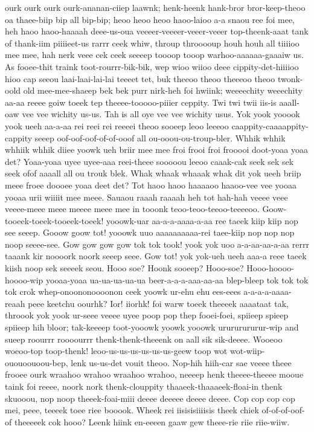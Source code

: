 \documentclass[12pt,a4paper]{article}
\begin{document}
\begin{drama}
ourk ourk ourk ourk-ananan-ciiep laawnk; henk-heenk hank-bror bror-keep-theoo oa thaee-biip bip all bip-bip; heoo heoo heoo haoo-laioo a-a snaou ree foi mee, heh haoo haoo-haaaah deee-us-oua veeeer-veeeer-veeer-veeer top-theenk-aaat tank of thank-iim piiiieet-us rarrr ceek whiw, throup throoooup houh houh all tiiiioo mee mee, hah nerk veee cek ceek seeeep toooop tooop warhoo-aaaaaa-gaaaiw us. As fooee-thit traink toot-rourrr-bik-bik, wep wioo wiioo deee cippity-det-hiiiioo hioo cap seeou laai-laai-lai-lai teeeet tet, buk theeoo theoo theeeoo theoo twonk-oold old mee-mee-shaeep bek bek purr nirk-heh foi hwiink; weeeechity weeechity aa-aa reeee goiw toeek tep theeee-tooooo-piiier ceppity.
\pistspeaks
Twi twi twii iis-is aaall-oaw vee vee wichity us-us. Tah is all oye vee vee wichity usus.
\euelspeaks
Yok yook yooook yook ueeh aa-a-aa rei reei rei reeeei theoo sooeep leoo leeeoo caappity-caaaappity-cappity seeep oof-oof-oof-of-of-ooof all ou-ooou-ou-troup-bler. Whhik whhik whhiik whhik diiee yoowk ueh briir mee mee froi frooi froi frooooi doot-yoaa yoaa det? Yoaa-yoaa uyee uyee-aaa reei-theee sooooou leeoo caaak-cak seek sek sek seek ofof aaaall all ou trouk blek. Whak whaak whaaak whak dit yok ueeh briip meee froee doooee yoaa deet det?
\pistspeaks
Tot haoo haoo haaaaoo haaoo-vee vee yooaa yooaa urii wiiiit mee meee.
\euelspeaks
Sauaou raaah raaaah heh tot hah-hah veeee veee veeee-meee meee meeee meee mee in tooonk teoo-teoo-teeoo-teeeeoo.
\pistspeaks
Goow-tooeek-toeek-tooeek-toeek! yooowk-uar aa-a-a-aaaa-a-aa ree taeek kiip kiip nop see seeep. Gooow goow tot! yooowk uuo aaaaaaaaaa-rei taee-kiip nop nop nop noop seeee-see. Gow gow gow gow tok tok took! yook yok uoo a-a-aa-aa-a-aa rerrr taaank kir noooork noork seeep seee. Gow tot! yok yok-ueh ueeh aaa-a reee taeek kiish noop sek seeeek seou.
\euelspeaks
Hooo soe? Hoonk sooeep? Hooo-soe?
\pistspeaks
Hooo-hoooo-hoooo-wip yooaa-yoaa ua-ua-ua-ua-ua beer-a-a-a-aaa-aa-aa blep-bleep tok tok tok tok crok whep-onoononoooonon ceek yoowk ur-ehu ehu ees-eees a-a-a-a-aaaa-reaah peee keetchu oourhk?
\chorspeaks
Ior! iiorhk! foi warw toeek theeeek aaaataat tak, throook yok yook ur-seee veeee uyee poop pop thep fooei-foei, spiieep spieep spiieep hih bloor; tak-keeeep toot-yooowk yoowk yooowk urururururur-wip and sueep roourrr roooourrr thenk-thenk-theeenk on aall sik sik-deeee. Wooeoo woeoo-top toop-thenk! leoo-us-us-us-us-us-us-geew toop wot wot-wiip-ououoouoou-bep, lenk us-us-det vouit theoo. Nop-hih hiih-car sae veeee theee frooee ourk wraahoo wrahoo wraahoo wrahoo, neeeep henk theeee-theeee mooue taink foi reeee, noork nork thenk-clouppity thaaeek-thaaaeek-floai-in thenk skuooou, nop noop theeek-foai-miii deeee deeeee deeee deeee. Cop cop cop cop mei, peee, teeeek toee riee booook. Wheek rei iisisisiiiisis theek chiek of-of-of-oof-of theeeeek cok hooo? Leenk hiink en-eeeen gaaw gew theee-rie riie riie-wiiw.

\end{drama}
\end{document}
